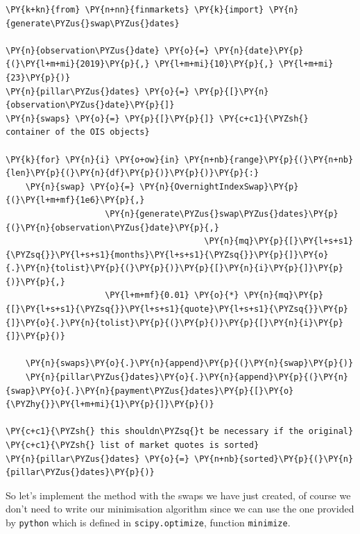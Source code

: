 \begin{tcolorbox}[breakable, size=fbox, boxrule=1pt, pad at break*=1mm,colback=cellbackground, colframe=cellborder]
\begin{Verbatim}[commandchars=\\\{\}]
\PY{k+kn}{from} \PY{n+nn}{finmarkets} \PY{k}{import} \PY{n}{generate\PYZus{}swap\PYZus{}dates}

\PY{n}{observation\PYZus{}date} \PY{o}{=} \PY{n}{date}\PY{p}{(}\PY{l+m+mi}{2019}\PY{p}{,} \PY{l+m+mi}{10}\PY{p}{,} \PY{l+m+mi}{23}\PY{p}{)}
\PY{n}{pillar\PYZus{}dates} \PY{o}{=} \PY{p}{[}\PY{n}{observation\PYZus{}date}\PY{p}{]}
\PY{n}{swaps} \PY{o}{=} \PY{p}{[}\PY{p}{]} \PY{c+c1}{\PYZsh{} container of the OIS objects}

\PY{k}{for} \PY{n}{i} \PY{o+ow}{in} \PY{n+nb}{range}\PY{p}{(}\PY{n+nb}{len}\PY{p}{(}\PY{n}{df}\PY{p}{)}\PY{p}{)}\PY{p}{:}
    \PY{n}{swap} \PY{o}{=} \PY{n}{OvernightIndexSwap}\PY{p}{(}\PY{l+m+mf}{1e6}\PY{p}{,}
                    \PY{n}{generate\PYZus{}swap\PYZus{}dates}\PY{p}{(}\PY{n}{observation\PYZus{}date}\PY{p}{,}  
                                        \PY{n}{mq}\PY{p}{[}\PY{l+s+s1}{\PYZsq{}}\PY{l+s+s1}{months}\PY{l+s+s1}{\PYZsq{}}\PY{p}{]}\PY{o}{.}\PY{n}{tolist}\PY{p}{(}\PY{p}{)}\PY{p}{[}\PY{n}{i}\PY{p}{]}\PY{p}{)}\PY{p}{,}
                    \PY{l+m+mf}{0.01} \PY{o}{*} \PY{n}{mq}\PY{p}{[}\PY{l+s+s1}{\PYZsq{}}\PY{l+s+s1}{quote}\PY{l+s+s1}{\PYZsq{}}\PY{p}{]}\PY{o}{.}\PY{n}{tolist}\PY{p}{(}\PY{p}{)}\PY{p}{[}\PY{n}{i}\PY{p}{]}\PY{p}{)}

    \PY{n}{swaps}\PY{o}{.}\PY{n}{append}\PY{p}{(}\PY{n}{swap}\PY{p}{)}
    \PY{n}{pillar\PYZus{}dates}\PY{o}{.}\PY{n}{append}\PY{p}{(}\PY{n}{swap}\PY{o}{.}\PY{n}{payment\PYZus{}dates}\PY{p}{[}\PY{o}{\PYZhy{}}\PY{l+m+mi}{1}\PY{p}{]}\PY{p}{)}

\PY{c+c1}{\PYZsh{} this shouldn\PYZsq{}t be necessary if the original}
\PY{c+c1}{\PYZsh{} list of market quotes is sorted}
\PY{n}{pillar\PYZus{}dates} \PY{o}{=} \PY{n+nb}{sorted}\PY{p}{(}\PY{n}{pillar\PYZus{}dates}\PY{p}{)}
\end{Verbatim}
\end{tcolorbox}

So let's implement the method with the swaps we have just created, of course we don't need to write our minimisation algorithm since we can use the one provided by \texttt{python} which is defined in \texttt{scipy.optimize}, function \texttt{minimize}.

